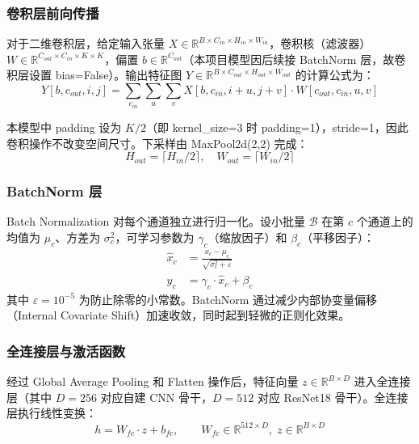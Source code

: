\documentclass[11pt,a4paper]{ctexart}
\newcommand{\rb}[1]{\ensuremath{\mathbb{R}^{#1}}}
\begin{document}
\subsubsection{卷积层前向传播}

对于二维卷积层，给定输入张量 $X \in \rb{B \times C_{in} \times H_{in} \times W_{in}}$，卷积核（滤波器）$W \in \rb{C_{out} \times C_{in} \times K \times K}$，偏置 $b \in \rb{C_{out}}$（本项目模型因后续接 BatchNorm 层，故卷积层设置 bias=False）。输出特征图 $Y \in \rb{B \times C_{out} \times H_{out} \times W_{out}}$ 的计算公式为：
\begin{equation}
Y[b, c_{out}, i, j] = \sum_{c_{in}} \sum_{u} \sum_{v} X[b, c_{in}, i+u, j+v] \cdot W[c_{out}, c_{in}, u, v]
\end{equation}

本模型中 padding 设为 $K/2$（即 kernel\_size=3 时 padding=1），stride=1，因此卷积操作不改变空间尺寸。下采样由 MaxPool2d(2,2) 完成：
\begin{equation}
H_{out} = \lceil H_{in} / 2 \rceil,\quad W_{out} = \lceil W_{in} / 2 \rceil
\end{equation}

\subsubsection{BatchNorm 层}

Batch Normalization 对每个通道独立进行归一化。设小批量 $\mathcal{B}$ 在第 $c$ 个通道上的均值为 $\mu_c$、方差为 $\sigma_c^2$，可学习参数为 $\gamma_c$（缩放因子）和 $\beta_c$（平移因子）：
\begin{align}
\hat{x}_c &= \frac{x_c - \mu_c}{\sqrt{\sigma_c^2 + \varepsilon}} \\
y_c &= \gamma_c \cdot \hat{x}_c + \beta_c
\end{align}
其中 $\varepsilon = 10^{-5}$ 为防止除零的小常数。BatchNorm 通过减少内部协变量偏移（Internal Covariate Shift）加速收敛，同时起到轻微的正则化效果。

\subsubsection{全连接层与激活函数}

经过 Global Average Pooling 和 Flatten 操作后，特征向量 $z \in \rb{B \times D}$ 进入全连接层（其中 $D=256$ 对应自建 CNN 骨干，$D=512$ 对应 ResNet18 骨干）。全连接层执行线性变换：
\begin{equation}
h = W_{fc} \cdot z + b_{fc},\qquad W_{fc} \in \rb{512 \times D},\; z \in \rb{B \times D}
\end{equation}
\end{document}
